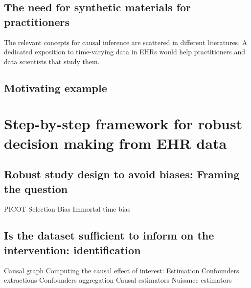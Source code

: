 \documentclass{report}
\begin{document}
\subsection{The need for synthetic materials for practitioners}%
\label{subsec:causal_tuto:synthetic_materials}%

The relevant concepts for causal inference are scattered in different literatures. A dedicated exposition to time-varying data in EHRs would help practitioners and data scientists that study them.
\subsection{Motivating example}\label{subsec:causal_tuto:motivating_example}


\section{Step-by-step framework for robust decision making from EHR data}%
\label{sec:causal_tuto:framework}%

\subsection{Robust study design to avoid biases: Framing the question}%
\label{subsec:causal_tuto:framing}%

PICOT
Selection Bias
Immortal time bias

\subsection{Is the dataset sufficient to inform on the intervention: identification}%
\label{subsec:causal_tuto:identification}%
Causal graph Computing the causal effect of interest: Estimation Confounders
extractions Confounders aggregation Causal estimators Nuisance estimators
\end{document}
